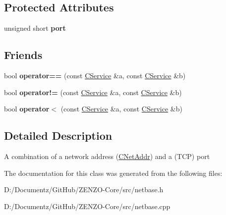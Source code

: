 \subsection*{Protected Attributes}
\begin{DoxyCompactItemize}
\item 
\mbox{\label{class_c_service_aef17734203dc2125cbdf4d23e50be410}} 
unsigned short {\bfseries port}
\end{DoxyCompactItemize}
\subsection*{Friends}
\begin{DoxyCompactItemize}
\item 
\mbox{\label{class_c_service_a7abc2516fa7e015cafcf9b98bc33e2ea}} 
bool {\bfseries operator==} (const \mbox{\hyperlink{class_c_service}{C\+Service}} \&a, const \mbox{\hyperlink{class_c_service}{C\+Service}} \&b)
\item 
\mbox{\label{class_c_service_a5834e0ab5104fffac621ea53fa2c3860}} 
bool {\bfseries operator!=} (const \mbox{\hyperlink{class_c_service}{C\+Service}} \&a, const \mbox{\hyperlink{class_c_service}{C\+Service}} \&b)
\item 
\mbox{\label{class_c_service_a26d0e22a8e7ae213b25467da3556c9e4}} 
bool {\bfseries operator$<$} (const \mbox{\hyperlink{class_c_service}{C\+Service}} \&a, const \mbox{\hyperlink{class_c_service}{C\+Service}} \&b)
\end{DoxyCompactItemize}


\subsection{Detailed Description}
A combination of a network address (\mbox{\hyperlink{class_c_net_addr}{C\+Net\+Addr}}) and a (T\+CP) port 

The documentation for this class was generated from the following files\+:\begin{DoxyCompactItemize}
\item 
D\+:/\+Documentz/\+Git\+Hub/\+Z\+E\+N\+Z\+O-\/\+Core/src/netbase.\+h\item 
D\+:/\+Documentz/\+Git\+Hub/\+Z\+E\+N\+Z\+O-\/\+Core/src/netbase.\+cpp\end{DoxyCompactItemize}
